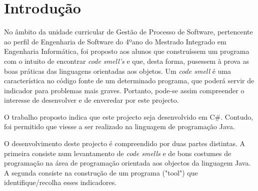 \chapter{Introdução}

\hspace{5mm} No âmbito da unidade curricular de Gestão de Processo de Software, pertencente ao perfil de Engenharia de Software do 4ºano do Mestrado Integrado em Engenharia Informática, foi proposto aos alunos que construíssem um programa com o intuito de encontrar \textit{code smell's} e que, desta forma, pusessem à prova as boas práticas das linguagens orientadas aos objetos. Um \textit{code smell} é uma característica no código fonte de um determinado programa, que poderá servir de indicador para problemas mais graves. Portanto, pode-se assim compreender o interesse de desenvolver e de enveredar por este projecto.
\par O trabalho proposto indica que este projecto seja desenvolvido em C#. Contudo, foi permitido que viesse a ser realizado na linguagem de programação Java.
\par O desenvolvimento deste projecto é compreendido por duas partes distintas. A primeira consiste num levantamento de \textit{code smells} e de bons costumes de programação na área de programação orientada aos objectos da linguagem Java. A segunda consiste na construção de um programa ("tool") que identifique/recolha esses indicadores.


